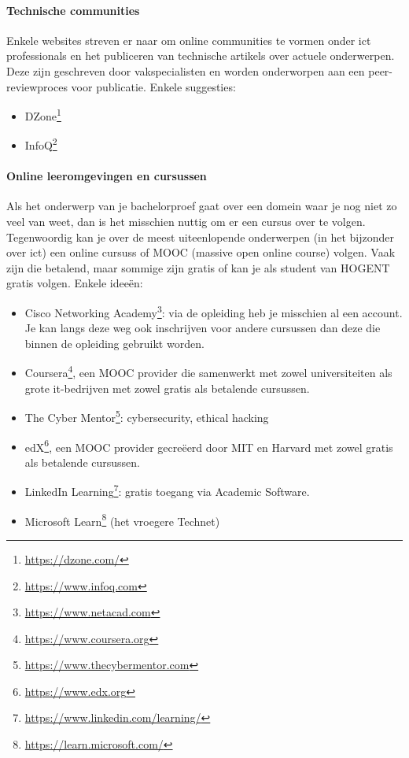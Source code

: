 \paragraph{Technische communities}

Enkele websites streven er naar om online communities te vormen onder ict professionals en het publiceren van technische artikels over actuele onderwerpen. Deze zijn geschreven door vakspecialisten en worden onderworpen aan een peer-re\-view\-pro\-ces voor publicatie. Enkele suggesties:

\begin{itemize}
  \item DZone\footnote{\url{https://dzone.com/}}
  \item InfoQ\footnote{\url{https://www.infoq.com}}
\end{itemize}

\paragraph{Online leeromgevingen en cursussen}

Als het onderwerp van je bachelorproef gaat over een domein waar je nog niet zo veel van weet, dan is het misschien nuttig om er een cursus over te volgen. Tegenwoordig kan je over de meest uiteenlopende onderwerpen (in het bijzonder over ict) een online cursuss of MOOC (massive open online course) volgen. Vaak zijn die betalend, maar sommige zijn gratis of kan je als student van HOGENT gratis volgen. Enkele ideeën:

\begin{itemize}
  \item Cisco Networking Academy\footnote{\url{https://www.netacad.com}}: via de opleiding heb je misschien al een account. Je kan langs deze weg ook inschrijven voor andere cursussen dan deze die binnen de opleiding gebruikt worden.
  \item Coursera\footnote{\url{https://www.coursera.org}}, een MOOC provider die samenwerkt met zowel universiteiten als grote it-bedrijven met zowel gratis als betalende cursussen.
  \item The Cyber Mentor\footnote{\url{https://www.thecybermentor.com}}: cybersecurity, ethical hacking
  \item edX\footnote{\url{https://www.edx.org}}, een MOOC provider gecreëerd door MIT en Harvard met zowel gratis als betalende cursussen.
  \item LinkedIn Learning\footnote{\url{https://www.linkedin.com/learning/}}: gratis toegang via Academic Software.
  \item Microsoft Learn\footnote{\url{https://learn.microsoft.com/}} (het vroegere Technet)
\end{itemize}

